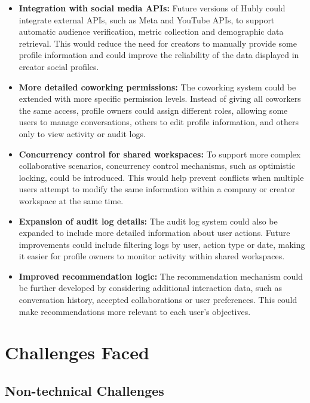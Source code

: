 \begin{itemize}
\item \textbf{Integration with social media APIs:} Future versions of Hubly could integrate external APIs, such as Meta and YouTube APIs, to support automatic audience verification, metric collection and demographic data retrieval. This would reduce the need for creators to manually provide some profile information and could improve the reliability of the data displayed in creator social profiles.

\item \textbf{More detailed coworking permissions:} The coworking system could be extended with more specific permission levels. Instead of giving all coworkers the same access, profile owners could assign different roles, allowing some users to manage conversations, others to edit profile information, and others only to view activity or audit logs.

\item \textbf{Concurrency control for shared workspaces:} To support more complex collaborative scenarios, concurrency control mechanisms, such as optimistic locking, could be introduced. This would help prevent conflicts when multiple users attempt to modify the same information within a company or creator workspace at the same time.

\item \textbf{Expansion of audit log details:} The audit log system could also be expanded to include more detailed information about user actions. Future improvements could include filtering logs by user, action type or date, making it easier for profile owners to monitor activity within shared workspaces.

\item \textbf{Improved recommendation logic:} The recommendation mechanism could be further developed by considering additional interaction data, such as conversation history, accepted collaborations or user preferences. This could make recommendations more relevant to each user's objectives.

\end{itemize}

\section{Challenges Faced}

\subsection{Non-technical Challenges}

